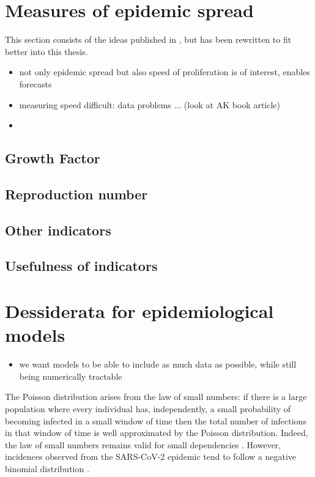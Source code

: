 \section{Measures of epidemic spread}
\label{sec:measures_of_epidemic_spread}
This section consists of the ideas published in \cite{Heyder2023Measures}, but has been rewritten to fit better into this thesis.

\begin{itemize}
    \item not only epidemic spread but also speed of proliferation is of interest, enables forecasts
    \item measuring speed difficult: data problems ... (look at AK book article)
    \item 
\end{itemize}

\subsection{Growth Factor}
\label{subsec:growth_factor}
\subsection{Reproduction number}
\label{subsec:reproduction_number}

\subsection{Other indicators}
\label{subsec:other_indicat}

\subsection{Usefulness of indicators}
\label{subsec:usefulness_of_indicators}


\section{Dessiderata for epidemiological models}
\label{sec:dessiderata}

\begin{itemize}
    \item we want models to be able to include as much data as possible, while still being numerically tractable 
\end{itemize}

The Poisson distribution arises from the law of small numbers: if there is a large population where every individual has, independently, a small probability of becoming infected in a small window of time then the total number of infections in that window of time is well approximated by the Poisson distribution.
Indeed, the law of small numbers remains valid for small dependencies \cite{Ross2011Fundamentalsa,Arratia1990Poisson}.
However, incidences observed from the SARS-CoV-2 epidemic tend to follow a negative binomial distribution \cite{Chan2021Count}. 




